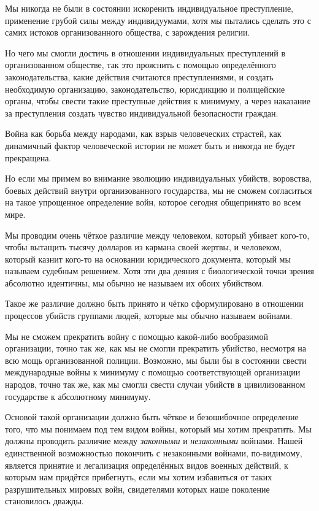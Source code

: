 Мы никогда не были в состоянии искоренить индивидуальное преступление, применение грубой силы между индивидуумами, хотя мы пытались сделать это с самих истоков организованного общества, с зарождения религии.
 
Но чего мы смогли достичь в отношении индивидуальных преступлений в организованном обществе, так это прояснить с помощью определённого законодательства, какие действия считаются преступлениями, и создать необходимую организацию, законодательство, юрисдикцию и полицейские органы, чтобы свести такие преступные действия к минимуму, а через наказание за преступления создать чувство индивидуальной безопасности граждан.
 
Война как борьба между народами, как взрыв человеческих страстей, как динамичный фактор человеческой истории не может быть и никогда не будет прекращена.
 
Но если мы примем во внимание эволюцию индивидуальных убийств, воровства, боевых действий внутри организованного государства, мы не сможем согласиться на такое упрощенное определение войн, которое сегодня общепринято во всем мире.
 
Мы проводим очень чёткое различие между человеком, который убивает кого-то, чтобы вытащить тысячу долларов из кармана своей жертвы, и человеком, который казнит кого-то на основании юридического документа, который мы называем судебным решением. Хотя эти два деяния с биологической точки зрения абсолютно идентичны, мы обычно не называем их обоих убийством.
 
Такое же различие должно быть принято и чётко сформулировано в отношении процессов убийств группами людей, которые мы обычно называем войнами.
 
Мы не сможем прекратить войну с помощью какой-либо вообразимой организации, точно так же, как мы не смогли прекратить убийство, несмотря на всю мощь организованной полиции. Возможно, мы были бы в состоянии свести международные войны к минимуму с помощью соответствующей организации народов, точно так же, как мы смогли свести случаи убийств в цивилизованном государстве к абсолютному минимуму.
 
Основой такой организации должно быть чёткое и безошибочное определение того, что мы понимаем под тем видом войны, который мы хотим прекратить. Мы должны проводить различие между \textit{законными} и \textit{незаконными} войнами. Нашей единственной возможностью покончить с незаконными войнами, по-видимому, является принятие и легализация определённых видов военных действий, к которым нам придётся прибегнуть, если мы хотим избавиться от таких разрушительных мировых войн, свидетелями которых наше поколение становилось дважды.
 
